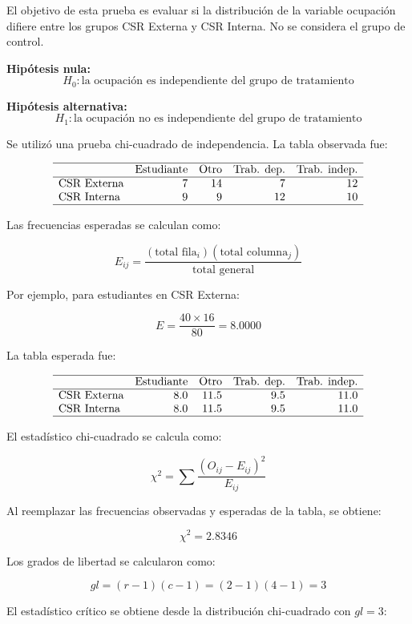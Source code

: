 \documentclass[12pt,letterpaper]{article}
\begin{document}
El objetivo de esta prueba es evaluar si la distribución de la variable ocupación difiere entre los grupos CSR Externa y CSR Interna. No se considera el grupo de control.

\textbf{Hipótesis nula:}
\[
H_0: \text{la ocupación es independiente del grupo de tratamiento}
\]

\textbf{Hipótesis alternativa:}
\[
H_1: \text{la ocupación no es independiente del grupo de tratamiento}
\]

Se utilizó una prueba chi-cuadrado de independencia. La tabla observada fue:

\[
\begin{array}{lrrrr}
\hline
 & \text{Estudiante} & \text{Otro} & \text{Trab. dep.} & \text{Trab. indep.} \\
\hline
\text{CSR Externa} & 7 & 14 & 7 & 12 \\
\text{CSR Interna} & 9 & 9 & 12 & 10 \\
\hline
\end{array}
\]

Las frecuencias esperadas se calculan como:

\[
E_{ij} =
\frac{(\text{total fila}_i)(\text{total columna}_j)}
{\text{total general}}
\]

Por ejemplo, para estudiantes en CSR Externa:

\[
E =
\frac{40 \times 16}{80}
= 8.0000
\]

La tabla esperada fue:

\[
\begin{array}{lrrrr}
\hline
 & \text{Estudiante} & \text{Otro} & \text{Trab. dep.} & \text{Trab. indep.} \\
\hline
\text{CSR Externa} & 8.0 & 11.5 & 9.5 & 11.0 \\
\text{CSR Interna} & 8.0 & 11.5 & 9.5 & 11.0 \\
\hline
\end{array}
\]

El estadístico chi-cuadrado se calcula como:

\[
\chi^2 =
\sum \frac{(O_{ij}-E_{ij})^2}{E_{ij}}
\]

Al reemplazar las frecuencias observadas y esperadas de la tabla, se obtiene:

\[
\chi^2 = 2.8346
\]

Los grados de libertad se calcularon como:

\[
gl = (r-1)(c-1) = (2-1)(4-1) = 3
\]

El estadístico crítico se obtiene desde la distribución chi-cuadrado con \(gl = 3\):
\end{document}
